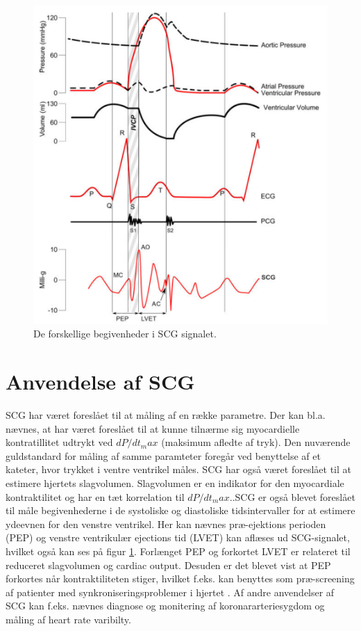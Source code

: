 \begin{figure}[H] %
\begin{center}
\includegraphics[width=1\textwidth]{figures/wigger}
\end{center}
\caption{De forskellige begivenheder i SCG signalet. \cite{zanetti}}
\label{fig:wigger}
\end{figure}


\section{Anvendelse af SCG}
SCG har været foreslået til at måling af en række parametre. Der kan bl.a. nævnes, at har været foreslået til at kunne tilnærme sig myocardielle kontratillitet udtrykt ved $dP/dt_max$ (maksimum afledte af tryk). Den nuværende guldstandard for måling af samme paramteter foregår ved benyttelse af et kateter, hvor trykket i ventre ventrikel måles. SCG har også været foreslået til at estimere hjertets slagvolumen. Slagvolumen er en indikator for den myocardiale kontraktilitet og har en tæt korrelation til $dP/dt_max$..SCG er også blevet foreslået til måle begivenhederne i de systoliske og diastoliske tidsintervaller for at estimere ydeevnen for den venstre ventrikel. Her kan nævnes  præ-ejektions perioden (PEP) og venstre ventrikulær ejections tid (LVET) kan aflæses ud SCG-signalet, hvilket også kan ses på figur \ref{fig:wigger}. Forlænget PEP og forkortet LVET er relateret til reduceret slagvolumen og cardiac output. Desuden er det blevet vist at PEP forkortes når kontraktiliteten stiger, hvilket f.eks. kan benyttes som præ-screening af patienter med synkroniseringsproblemer i hjertet  \cite{Zanetti}  \cite{abra}. Af andre anvendelser af SCG kan f.eks. nævnes diagnose og monitering af koronararteriesygdom og måling af heart rate varibilty.


